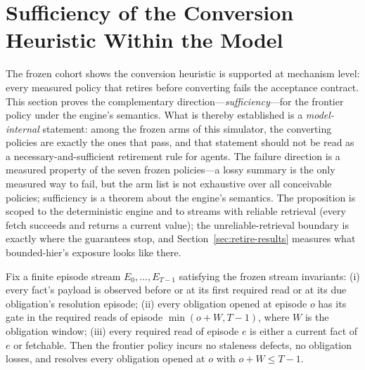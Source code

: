 \section{Sufficiency of the Conversion Heuristic Within the Model}\label{sec:sufficiency}

The frozen cohort shows the conversion heuristic is supported at
mechanism level: every measured policy that retires before converting
fails the acceptance contract. This section proves the complementary
direction---\emph{sufficiency}---for the frontier policy under the
engine's semantics. What is thereby established is a
\emph{model-internal} statement: among the frozen arms of this
simulator, the converting policies are exactly the ones that pass,
and that statement should not be read as a necessary-and-sufficient
retirement rule for agents. The failure direction is a measured
property of the
seven frozen policies---a lossy summary is the only measured way to
fail, but the arm list is not exhaustive over all conceivable
policies; sufficiency is a theorem about the engine's semantics. The
proposition is scoped to the deterministic engine and to streams with
reliable retrieval (every fetch succeeds and returns a current
value); the unreliable-retrieval boundary is exactly where the
guarantees stop, and Section~\ref{sec:retire-results} measures what
bounded-hier's exposure looks like there.

\begin{proposition}\label{prop:sufficiency}
Fix a finite episode stream $E_0,\dots,E_{T-1}$ satisfying the frozen
stream invariants: (i) every fact's payload is observed before or at
its first required read or at its due obligation's resolution episode;
(ii) every obligation opened at episode $o$ has its gate in the
required reads of episode $\min(o+W, T-1)$, where $W$ is the
obligation window; (iii) every required read of episode $e$ is either
a current fact of $e$ or fetchable. Then the frontier policy incurs
no staleness defects, no obligation losses, and resolves every
obligation opened at $o$ with $o+W\le T-1$.
\end{proposition}

